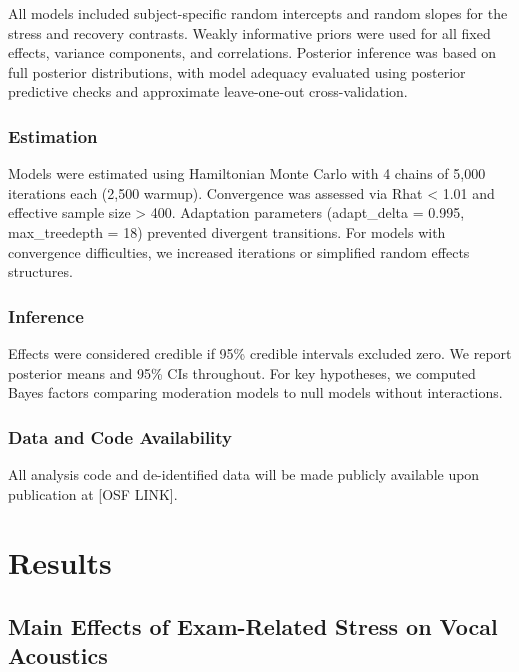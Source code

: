 \documentclass[
  english,
  man]{apa6}
\begin{document}
All models included subject-specific random intercepts and random slopes for the stress and recovery contrasts. Weakly informative priors were used for all fixed effects, variance components, and correlations. Posterior inference was based on full posterior distributions, with model adequacy evaluated using posterior predictive checks and approximate leave-one-out cross-validation.

\subsubsection{Estimation}\label{estimation}

Models were estimated using Hamiltonian Monte Carlo with 4 chains of 5,000 iterations each (2,500 warmup). Convergence was assessed via Rhat \textless{} 1.01 and effective sample size \textgreater{} 400. Adaptation parameters (adapt\_delta = 0.995, max\_treedepth = 18) prevented divergent transitions. For models with convergence difficulties, we increased iterations or simplified random effects structures.

\subsubsection{Inference}\label{inference}

Effects were considered credible if 95\% credible intervals excluded zero. We report posterior means and 95\% CIs throughout. For key hypotheses, we computed Bayes factors comparing moderation models to null models without interactions.

\subsubsection{Data and Code Availability}\label{data-and-code-availability}

All analysis code and de-identified data will be made publicly available upon publication at {[}OSF LINK{]}.

\section{Results}\label{results}

\subsection{Main Effects of Exam-Related Stress on Vocal Acoustics}\label{main-effects-of-exam-related-stress-on-vocal-acoustics}
\end{document}
